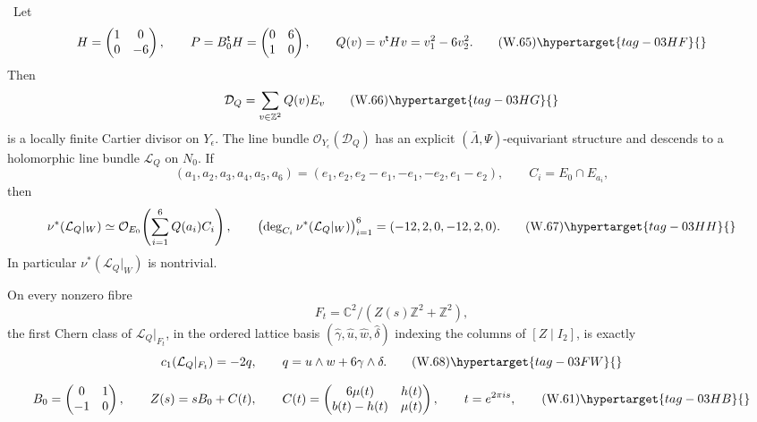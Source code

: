 
\begin{proposition}
\hypertarget{tag-03IN}{}\label{wbII:prop:local-cusp-picard-obstruction}


\ Let
\[
 H=\begin{pmatrix}1&0\\0&-6\end{pmatrix},
 \qquad
 P=B_0^{\mathsf t}H=\begin{pmatrix}0&6\\1&0\end{pmatrix},
 \qquad
 Q(v)=v^{\mathsf t}Hv=v_1^2-6v_2^2.
\tag{W.65}\hypertarget{tag-03HF}{}\label{wbII:eq:W:5.17x}
\]
Then
\[
 \mathcal D_Q=\sum_{v\in\mathbb Z^2}Q(v)E_v
\tag{W.66}\hypertarget{tag-03HG}{}\label{wbII:eq:W:5.17y}
\]
is a locally finite Cartier divisor on \(Y_\epsilon\).
The line bundle \(\mathcal O_{Y_\epsilon}(\mathcal D_Q)\) has an explicit
\((\bar\Lambda,\Psi)\)-equivariant structure and descends to a holomorphic
line bundle \(\mathcal L_Q\) on \(N_0\).  If
\[
 (a_1,a_2,a_3,a_4,a_5,a_6)
 =(e_1,e_2,e_2-e_1,-e_1,-e_2,e_1-e_2),
 \qquad C_i=E_0\cap E_{a_i},
\]
then
\[
 \nu^*(\mathcal L_Q|_W)
 \simeq
 \mathcal O_{E_0}\!\left(\sum_{i=1}^6Q(a_i)C_i\right),
\qquad
 \left(\deg_{C_i}\nu^*(\mathcal L_Q|_W)\right)_{i=1}^6
 =(-12,2,0,-12,2,0).
\tag{W.67}\hypertarget{tag-03HH}{}\label{wbII:eq:W:5.17z}
\]
In particular \(\nu^*(\mathcal L_Q|_W)\) is nontrivial.

On every nonzero fibre
\[
 F_t=\mathbb C^2/(Z(s)\mathbb Z^2+\mathbb Z^2),
\]
the first Chern class of \(\mathcal L_Q|_{F_t}\), in the ordered lattice
basis
\((\widehat\gamma,\widehat u,\widehat w,\widehat\delta)\) indexing the
columns of \([Z\mid I_2]\), is exactly
\[
 c_1(\mathcal L_Q|_{F_t})=-2q,
 \qquad
 q=u\wedge w+6\gamma\wedge\delta.
\tag{W.68}\hypertarget{tag-03FW}{}\label{wbII:eq:W:5.17aa}
\]
\end{proposition}

\[
 B_0=\begin{pmatrix}0&1\\-1&0\end{pmatrix},
 \qquad
 Z(s)=sB_0+C(t),
 \qquad
 C(t)=\begin{pmatrix}6\mu(t)&h(t)\\ b(t)-h(t)&\mu(t)\end{pmatrix},
 \qquad t=e^{2\pi i s},
\tag{W.61}\hypertarget{tag-03HB}{}\label{wbII:eq:W:5.17t}
\]

